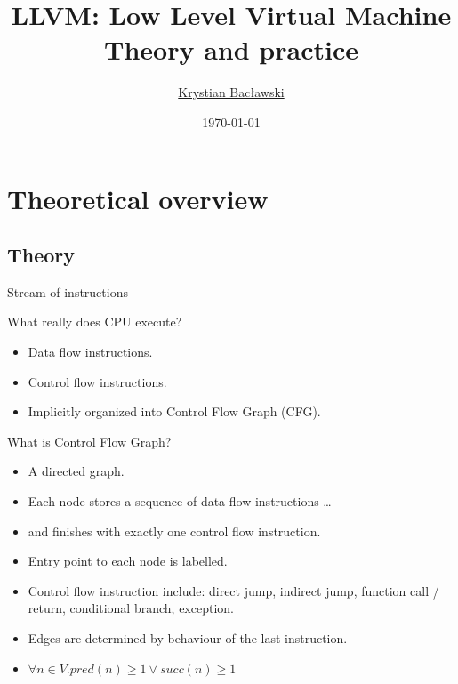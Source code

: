 \documentclass[8pt]{beamer}
\title[LLVM]{LLVM: Low Level Virtual Machine\\Theory and practice}
\author[Krystian Bacławski]{\href{mailto:cahirwpz@cs.uni.wroc.pl}{Krystian Bacławski}}
\institute{Computer Science Department\\University of Wrocław}
\date{\today}
\begin{document}
\begin{frame}
\titlepage
\end{frame}

\section[Theory]{Theoretical overview}
\subsection*{Theory}

\begin{frame}{Stream of instructions}
  \begin{block}{What really does CPU execute?}
    \begin{itemize}
      \item Data flow instructions.
      \item Control flow instructions.
      \item Implicitly organized into Control Flow Graph (CFG).
    \end{itemize}
  \end{block}

  \begin{block}{What is Control Flow Graph?}
    \begin{itemize}
      \item A directed graph.
      \item Each node stores a sequence of data flow instructions \ldots
      \item and finishes with exactly one control flow instruction.
      \item Entry point to each node is labelled.
      \item Control flow instruction include: direct jump, indirect jump,
        function call / return, conditional branch, exception.
      \item Edges are determined by behaviour of the last instruction.
      \item $\forall n \in V. pred(n) \ge 1 \lor succ(n) \ge 1$
    \end{itemize}
  \end{block}
\end{frame}
\end{document}
